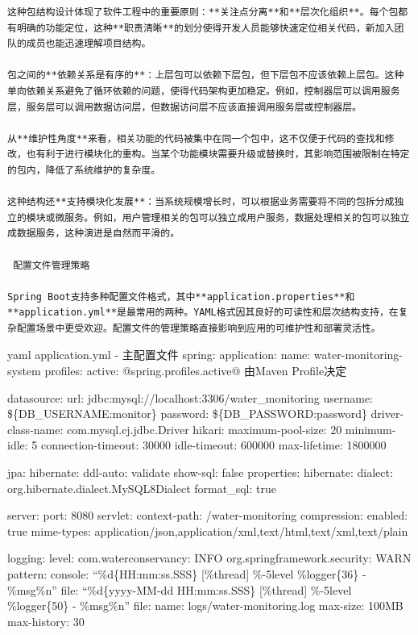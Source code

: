 \begin{lstlisting}
这种包结构设计体现了软件工程中的重要原则：**关注点分离**和**层次化组织**。每个包都有明确的功能定位，这种**职责清晰**的划分使得开发人员能够快速定位相关代码，新加入团队的成员也能迅速理解项目结构。

包之间的**依赖关系是有序的**：上层包可以依赖下层包，但下层包不应该依赖上层包。这种单向依赖关系避免了循环依赖的问题，使得代码架构更加稳定。例如，控制器层可以调用服务层，服务层可以调用数据访问层，但数据访问层不应该直接调用服务层或控制器层。

从**维护性角度**来看，相关功能的代码被集中在同一个包中，这不仅便于代码的查找和修改，也有利于进行模块化的重构。当某个功能模块需要升级或替换时，其影响范围被限制在特定的包内，降低了系统维护的复杂度。

这种结构还**支持模块化发展**：当系统规模增长时，可以根据业务需要将不同的包拆分成独立的模块或微服务。例如，用户管理相关的包可以独立成用户服务，数据处理相关的包可以独立成数据服务，这种演进是自然而平滑的。

 配置文件管理策略

Spring Boot支持多种配置文件格式，其中**application.properties**和**application.yml**是最常用的两种。YAML格式因其良好的可读性和层次结构支持，在复杂配置场景中更受欢迎。配置文件的管理策略直接影响到应用的可维护性和部署灵活性。
\end{lstlisting}

yaml  application.yml - 主配置文件 spring: application: name: water-monitoring-system profiles: active: @spring.profiles.active@  由Maven Profile决定

datasource: url: jdbc:mysql://localhost:3306/water\_monitoring username: \$\{DB\_USERNAME:monitor\} password: \$\{DB\_PASSWORD:password\} driver-class-name: com.mysql.cj.jdbc.Driver hikari: maximum-pool-size: 20 minimum-idle: 5 connection-timeout: 30000 idle-timeout: 600000 max-lifetime: 1800000

jpa: hibernate: ddl-auto: validate show-sql: false properties: hibernate: dialect: org.hibernate.dialect.MySQL8Dialect format\_sql: true

server: port: 8080 servlet: context-path: /water-monitoring compression: enabled: true mime-types: application/json,application/xml,text/html,text/xml,text/plain

logging: level: com.waterconservancy: INFO org.springframework.security: WARN pattern: console: ``\%d\{HH:mm:ss.SSS\} {[}\%thread{]} \%-5level \%logger\{36\} - \%msg\%n'' file: ``\%d\{yyyy-MM-dd HH:mm:ss.SSS\} {[}\%thread{]} \%-5level \%logger\{50\} - \%msg\%n'' file: name: logs/water-monitoring.log max-size: 100MB max-history: 30

